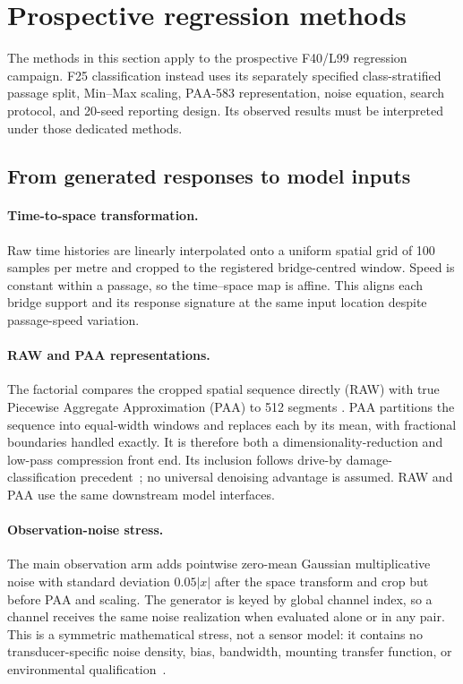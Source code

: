 \section{Prospective regression methods}
\label{sec:data_processing}

The methods in this section apply to the prospective F40/L99 regression
campaign. F25 classification instead uses its separately specified
class-stratified passage split, Min--Max scaling, PAA-583 representation,
noise equation, search protocol, and 20-seed reporting design. Its observed
results must be interpreted under those dedicated methods.

\subsection{From generated responses to model inputs}
\label{sec:preprocessing}

\paragraph{Time-to-space transformation.}
Raw time histories are linearly interpolated onto a uniform spatial grid of
100 samples per metre and cropped to the registered bridge-centred window.
Speed is constant within a passage, so the time--space map is affine. This
aligns each bridge support and its response signature at the same input
location despite passage-speed variation.

\paragraph{RAW and PAA representations.}
The factorial compares the cropped spatial sequence directly (RAW) with true
Piecewise Aggregate Approximation (PAA) to 512 segments
\cite{keogh2001dimensionality}. PAA partitions the sequence into equal-width
windows and replaces each by its mean, with fractional boundaries handled
exactly. It is therefore both a dimensionality-reduction and low-pass
compression front end. Its inclusion follows drive-by damage-classification
precedent~\cite{fernandes2025early}; no universal denoising advantage is
assumed. RAW and PAA use the same downstream model interfaces.

\paragraph{Observation-noise stress.}
The main observation arm adds pointwise zero-mean Gaussian multiplicative
noise with standard deviation $0.05|x|$ after the space transform and crop but
before PAA and scaling. The generator is keyed by global channel index, so a
channel receives the same noise realization when evaluated alone or in any
pair. This is a symmetric mathematical stress, not a sensor model: it contains
no transducer-specific noise density, bias, bandwidth, mounting transfer
function, or environmental qualification~\cite{en61373}.


